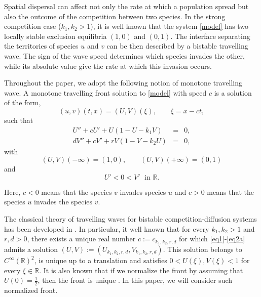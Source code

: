 \documentclass[11pt]{article}
\numberwithin{equation}{section}
\newcommand{\1}{\mathbbm{1}}
\numberwithin{equation}{section}
\theoremstyle{definition}
\def \R {\mathbb{R}}
\numberwithin{equation}{section}
\begin{document}
 Spatial dispersal can affect not only the rate at which a population spread but also the outcome of the competition between two species. In the strong competition case  ($k_1,k_2>1$), it is well known that the system \eqref{model} has two locally stable exclusion equilibria  $(1,0)$ and $(0,1)$. The interface separating the territories of species $u$ and $v$ can be then described by a bistable travelling wave.  The sign of the wave speed determines which species invades the other, while its absolute value give the rate at which this invasion occurs.
 
Throughout the paper, we adopt the following notion of monotone travelling wave. A monotone travelling front solution to \eqref{model}  with speed $c$ is a solution of the form,
 \begin{equation*}
 	(u,v)(t,x)=(U,V)(\xi), \qquad \xi=x-ct,
 \end{equation*}
such that
 \begin{equation}\label{eq1}
 	\begin{array}{llllll}
 	U''+cU'+U(1-U-k_1V)&=&0,\\
 	dV''+cV'+rV(1-V-k_2U)&=&0, 
 	\end{array} 
 \end{equation}
 with 
 \begin{equation}\label{eq2}
 	(U,V)(-\infty)=(1,0), \qquad (U,V)(+\infty)=(0,1) 
 \end{equation}
 and 
  \begin{equation}\label{eq2a}
 U'<0<V' \; \text{ in } \R.
 \end{equation}

Here, $c<0$ means that the species $v$ invades species $u$ and $c>0$ means that the species $u$ invades the species $v$. 
 
The classical theory of travelling waves for bistable competition-diffusion systems has been developed in \cite{conley1984, gardner1982, kan1995, kan1996}.  In particular, it well known that for every $k_1,k_2>1$ and $r,d>0$, there exists a unique real number $c:=c_{k_1,k_2,r,d}$ for which \eqref{eq1}-\eqref{eq2a} admits a solution $(U,V):=(U_{k_1,k_2,r,d}, V_{k_1,k_2,r,d})$. This solution belongs to $C^\infty(\R)^2$, is unique up to a translation and satisfies $0<U(\xi),V(\xi)<1$ for every $\xi\in\R$.  It is also known that if we normalize the front by assuming that  $U(0)=\frac{1}{2}$, then the front is unique \cite{girardin2015}. In this paper, we will consider such normalized front.
\end{document}

